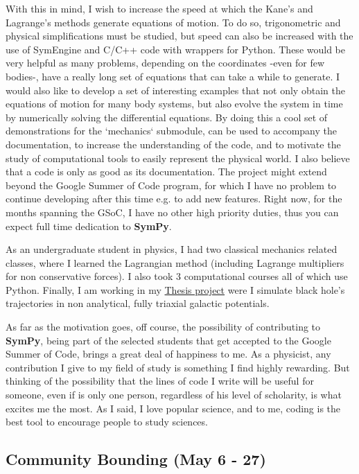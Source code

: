 \documentclass[12pt]{article}
\newcommand{\sympy}{\textbf{SymPy}}
\begin{document}
With this in mind, I wish to increase the speed at which the Kane's and Lagrange's methods generate equations of motion. To do so, trigonometric and physical simplifications must be studied, but speed can also be increased with the use of SymEngine and C/C++ code with wrappers for Python. These would be very helpful as many problems, depending on the coordinates -even for few bodies-, have a really long set of equations that can take a while to generate. I would also like to develop a set of interesting examples that not only obtain the equations of motion for many body systems, but also evolve the system in time by numerically solving the differential equations. By doing this a cool set of demonstrations for the `mechanics` submodule, can be used to accompany the documentation, to increase the understanding of the code, and to motivate the study of computational tools to easily represent the physical world. I also believe that a code is only as good as its documentation. The project might extend beyond the Google Summer of Code program, for which I have no problem to continue developing after this time e.g. to add new features. Right now, for the months spanning the GSoC, I have no other high priority duties, thus you can expect full time dedication to \sympy{}.

As an undergraduate student in physics, I had two classical mechanics related classes, where I learned the Lagrangian method (including Lagrange multipliers for non conservative forces). I also took 3 computational courses all of which use Python. Finally, I am working in my \href{https://github.com/jsbarbosa/TesisFisica}{Thesis project} were I simulate black hole's trajectories in non analytical, fully triaxial galactic potentials.

As far as the motivation goes, off course, the possibility of contributing to \sympy{}, being part of the selected students that get accepted to the Google Summer of Code, brings a great deal of happiness to me. As a physicist, any contribution I give to my field of study is something I find highly rewarding. But thinking of the possibility that the lines of code I write will be useful for someone, even if is only one person, regardless of his level of scholarity, is what excites me the most. As I said, I love popular science, and to me, coding is the best tool to encourage people to study sciences.

\subsection{Community Bounding (May 6 - 27)}
\end{document}

